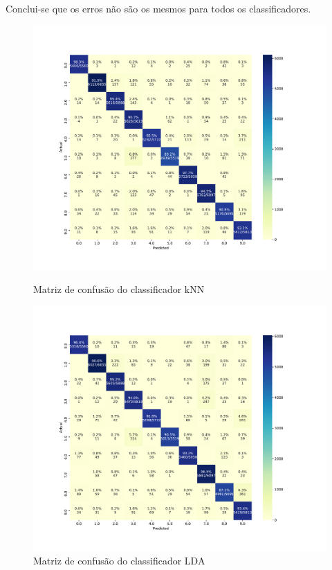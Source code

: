 \documentclass[12pt,
	english,			%
	french,				%
	spanish,			%
	brazil,				%
	]{article}
\begin{document}
Conclui-se que os erros não são os mesmos para todos os classificadores.

\begin{figure}[!htb]
  \begin{minipage}{.47\textwidth}
    \centering
    \includegraphics[width=1.1\textwidth]{confusion_knn.pdf}
    \caption{\label{fig:confusion_knn}Matriz de confusão do classificador kNN}
  \end{minipage}\hfill
  \begin{minipage}{.47\textwidth}
    \centering
    \includegraphics[width=1.1\textwidth]{confusion_lda.pdf}
    \caption{\label{fig:confusion_lda}Matriz de confusão do classificador LDA}
  \end{minipage}
\end{figure}
\end{document}

